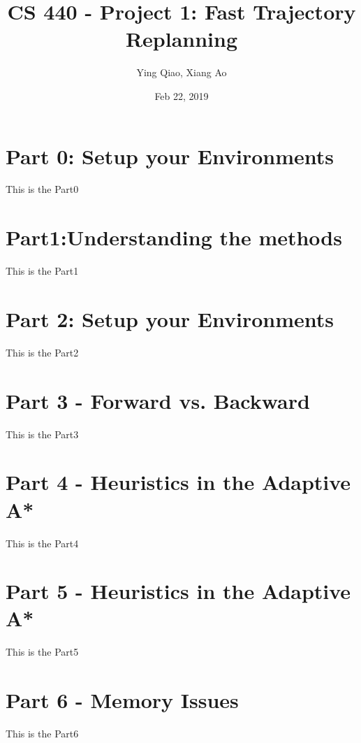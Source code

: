 \documentclass[12pt]{article}
\begin{document}
\begin{titlepage}
\title{CS 440 - Project 1: Fast Trajectory Replanning}
\author{Ying Qiao, Xiang Ao}
\date{Feb 22, 2019}
\clearpage\maketitle
\thispagestyle{empty}

\end{titlepage}

\tableofcontents
\thispagestyle{empty}

\cleardoublepage

\setcounter{page}{1}
\section{Part 0: Setup your Environments }\label{sec:Part0}
This is the Part0


\section{Part1:Understanding the methods}\label{sec:Part1}
This is the Part1

\section{Part 2: Setup your Environments }\label{sec:Part2}
This is the Part2


\section{Part 3 - Forward vs. Backward }\label{sec:Part3}
This is the Part3


\section{Part 4 - Heuristics in the Adaptive A* }\label{sec:Part4}
This is the Part4

\section{Part 5 - Heuristics in the Adaptive A*}\label{sec:Part5}
This is the Part5


\section{Part 6 - Memory Issues}\label{sec:Part1}
This is the Part6
\end{document}

